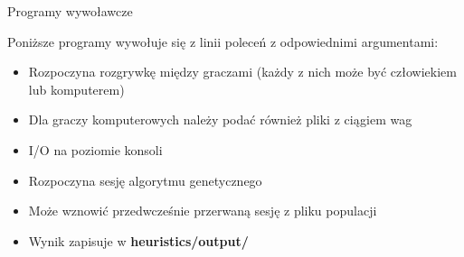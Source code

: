 \begin{frame}{Programy wywoławcze}

	Poniższe programy wywołuje się z linii poleceń z odpowiednimi argumentami:

	\begin{itemize}
		\begin{itemize}
			\item Rozpoczyna rozgrywkę między graczami (każdy z nich może być człowiekiem lub komputerem)
			\item Dla graczy komputerowych należy podać również pliki z ciągiem wag
			\item I/O na poziomie konsoli
		\end{itemize}
		\begin{itemize}
			\item Rozpoczyna sesję algorytmu genetycznego
			\item Może wznowić przedwcześnie przerwaną sesję z pliku populacji
			\item Wynik zapisuje w \textbf{heuristics/output/}
		\end{itemize}
	\end{itemize}





\end{frame}
